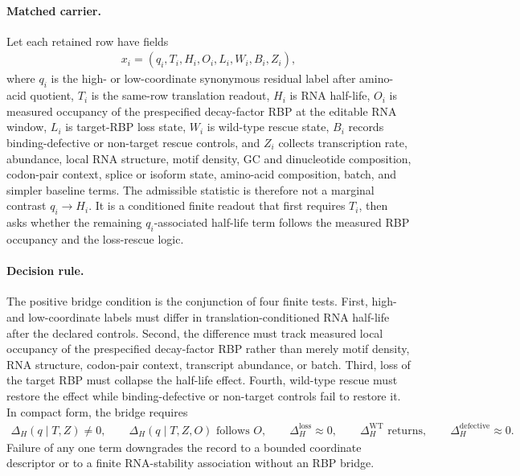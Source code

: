\paragraph{Matched carrier.}
Let each retained row have fields
$$
\begin{aligned}
  x_i = (q_i, T_i, H_i, O_i, L_i, W_i, B_i, Z_i),
\end{aligned}
$$
where $q_i$ is the high- or low-coordinate synonymous residual label after amino-acid quotient, $T_i$ is the same-row translation readout, $H_i$ is RNA half-life, $O_i$ is measured occupancy of the prespecified decay-factor RBP at the editable RNA window, $L_i$ is target-RBP loss state, $W_i$ is wild-type rescue state, $B_i$ records binding-defective or non-target rescue controls, and $Z_i$ collects transcription rate, abundance, local RNA structure, motif density, GC and dinucleotide composition, codon-pair context, splice or isoform state, amino-acid composition, batch, and simpler baseline terms.  The admissible statistic is therefore not a marginal contrast $q_i \to H_i$.  It is a conditioned finite readout that first requires $T_i$, then asks whether the remaining $q_i$-associated half-life term follows the measured RBP occupancy and the loss-rescue logic.

\paragraph{Decision rule.}
The positive bridge condition is the conjunction of four finite tests.  First, high- and low-coordinate labels must differ in translation-conditioned RNA half-life after the declared controls.  Second, the difference must track measured local occupancy of the prespecified decay-factor RBP rather than merely motif density, RNA structure, codon-pair context, transcript abundance, or batch.  Third, loss of the target RBP must collapse the half-life effect.  Fourth, wild-type rescue must restore the effect while binding-defective or non-target controls fail to restore it.  In compact form, the bridge requires
$$
\begin{aligned}
  \Delta_H(q \mid T,Z) \neq 0,\qquad
  \Delta_H(q \mid T,Z,O) \text{ follows } O,\qquad
  \Delta_H^{\mathrm{loss}} \approx 0,\qquad
  \Delta_H^{\mathrm{WT}} \text{ returns},\qquad
  \Delta_H^{\mathrm{defective}} \approx 0.
\end{aligned}
$$
Failure of any one term downgrades the record to a bounded coordinate descriptor or to a finite RNA-stability association without an RBP bridge.

